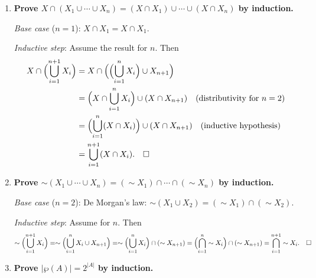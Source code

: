 \begin{enumerate}[{0.}1. ]
\textit{Base case} ($n=1$): $1 = \frac{1\cdot 2\cdot 3}{6}=1$. \checkmark

\textit{Inductive step}: Assume the formula holds for $n$. Then
\begin{align*}
\sum_{k=1}^{n+1}k^2 &= \frac{n(n+1)(2n+1)}{6} + (n+1)^2\\
&= \frac{n(n+1)(2n+1)+6(n+1)^2}{6}\\
&= \frac{(n+1)[n(2n+1)+6(n+1)]}{6}\\
&= \frac{(n+1)(2n^2+7n+6)}{6}\\
&= \frac{(n+1)(n+2)(2n+3)}{6}. \quad\square
\end{align*}

\item \textbf{Prove $X\cap(X_1\cup\cdots\cup X_n) = (X\cap X_1)\cup\cdots\cup(X\cap X_n)$ by induction.}

\textit{Base case} ($n=1$): $X\cap X_1 = X\cap X_1$. \checkmark

\textit{Inductive step}: Assume the result for $n$. Then
\begin{align*}
X\cap\Bigl(\bigcup_{i=1}^{n+1}X_i\Bigr)
&= X\cap\Bigl(\Bigl(\bigcup_{i=1}^n X_i\Bigr)\cup X_{n+1}\Bigr)\\
&= \Bigl(X\cap\bigcup_{i=1}^n X_i\Bigr)\cup(X\cap X_{n+1}) \quad\text{(distributivity for }n=2\text{)}\\
&= \Bigl(\bigcup_{i=1}^n(X\cap X_i)\Bigr)\cup(X\cap X_{n+1}) \quad\text{(inductive hypothesis)}\\
&= \bigcup_{i=1}^{n+1}(X\cap X_i). \quad\square
\end{align*}

\item \textbf{Prove $\sim(X_1\cup\cdots\cup X_n) = (\sim X_1)\cap\cdots\cap(\sim X_n)$ by induction.}

\textit{Base case} ($n=2$): De Morgan's law: $\sim(X_1\cup X_2)=(\sim X_1)\cap(\sim X_2)$. \checkmark

\textit{Inductive step}: Assume for $n$. Then
\[
\sim\Bigl(\bigcup_{i=1}^{n+1}X_i\Bigr) = \sim\Bigl(\bigcup_{i=1}^n X_i \cup X_{n+1}\Bigr) = \sim\Bigl(\bigcup_{i=1}^n X_i\Bigr)\cap(\sim X_{n+1}) = \Bigl(\bigcap_{i=1}^n\sim X_i\Bigr)\cap(\sim X_{n+1}) = \bigcap_{i=1}^{n+1}\sim X_i. \quad\square
\]

\item \textbf{Prove $|\wp(A)| = 2^{|A|}$ by induction.}


\end{enumerate}
